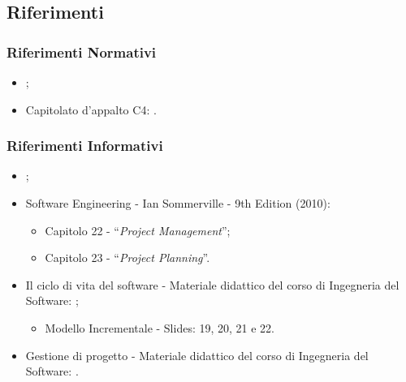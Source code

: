 \subsection{Riferimenti}
\subsubsection{Riferimenti Normativi}
\begin{itemize}
    \item {\NdP};
    \item Capitolato\glo{} d'appalto C4: \newline {}.
\end{itemize}

\subsubsection{Riferimenti Informativi}
\begin{itemize}
    \item {\PdQ};
    \item Software Engineering - Ian Sommerville - 9th Edition (2010):
        \begin{itemize}
            \item Capitolo 22 - “\textit{Project Management}”;
            \item Capitolo 23 - “\textit{Project Planning}”.
        \end{itemize}
    \item Il ciclo di vita del software - Materiale didattico del corso di Ingegneria del Software: \newline {};
        \begin{itemize}
            \item Modello Incrementale - Slides: 19, 20, 21 e 22.
        \end{itemize}
    \item Gestione di progetto - Materiale didattico del corso di Ingegneria del Software: \newline {}.
\end{itemize}



